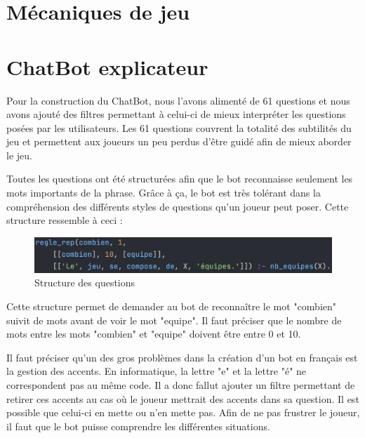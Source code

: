 \documentclass[a4paper, 11pt]{article}
\begin{document}
\newpage

\section{Mécaniques de jeu}

\newpage

\section{ChatBot explicateur}

Pour la construction du ChatBot, nous l'avons alimenté de 61 questions et nous avons ajouté des filtres permettant à celui-ci de mieux interpréter les questions posées par les utilisateurs. Les 61 questions couvrent la totalité des subtilités du jeu et permettent aux joueurs un peu perdus d'être guidé afin de mieux aborder le jeu.\newline

Toutes les questions ont été structurées afin que le bot reconnaisse seulement les mots importants de la phrase. Grâce à ça, le bot est très tolérant dans la compréhension des différents styles de questions qu'un joueur peut poser. Cette structure ressemble à ceci : 

\begin{figure}[!h]
	\centering
	\includegraphics[scale=.6]{assets/question-structure.png}
	\caption{Structure des questions}
\end{figure}

Cette structure permet de demander au bot de reconnaître le mot "combien" suivit de mots avant de voir le mot "equipe". Il faut préciser que le nombre de mots entre les mots "combien" et "equipe" doivent être entre 0 et 10.\newline

Il faut préciser qu'un des gros problèmes dans la création d'un bot en français est la gestion des accents. En informatique, la lettre "e" et la lettre "é" ne correspondent pas au même code. Il a donc fallut ajouter un filtre permettant de retirer ces accents au cas où le joueur mettrait des accents dans sa question. Il est possible que celui-ci en mette ou n'en mette pas. Afin de ne pas frustrer le joueur, il faut que le bot puisse comprendre les différentes situations.\newline
\end{document}
